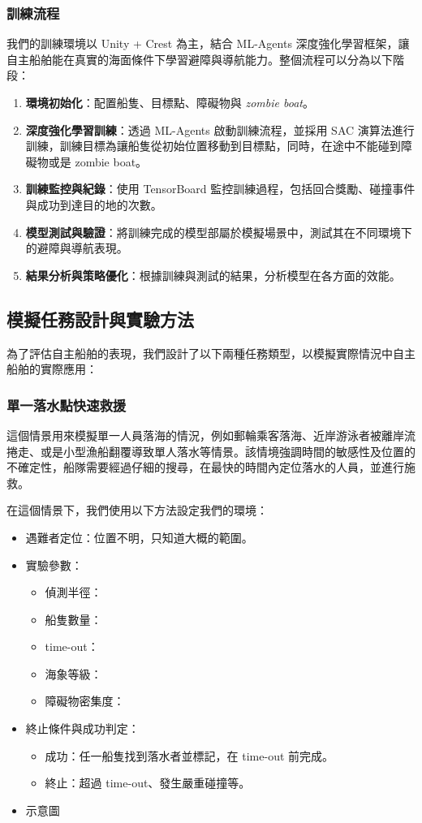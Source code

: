 \documentclass[12pt,a4paper]{article}
\begin{document}
\subsubsection{訓練流程}
我們的訓練環境以 Unity + Crest 為主，結合 ML-Agents 深度強化學習框架，讓自主船舶能在真實的海面條件下學習避障與導航能力。整個流程可以分為以下階段：
\begin{enumerate}
    \item \textbf{環境初始化}：配置船隻、目標點、障礙物與 \textit{zombie boat}。
    \item \textbf{深度強化學習訓練}：透過 ML-Agents 啟動訓練流程，並採用 SAC 演算法進行訓練，訓練目標為讓船隻從初始位置移動到目標點，同時，在途中不能碰到障礙物或是 zombie boat。
    \item \textbf{訓練監控與紀錄}：使用 TensorBoard 監控訓練過程，包括回合獎勵、碰撞事件與成功到達目的地的次數。
    \item \textbf{模型測試與驗證}：將訓練完成的模型部屬於模擬場景中，測試其在不同環境下的避障與導航表現。
    \item \textbf{結果分析與策略優化}：根據訓練與測試的結果，分析模型在各方面的效能。
\end{enumerate}

\subsection{模擬任務設計與實驗方法}
為了評估自主船舶的表現，我們設計了以下兩種任務類型，以模擬實際情況中自主船舶的實際應用：

\subsubsection{單一落水點快速救援}
這個情景用來模擬單一人員落海的情況，例如郵輪乘客落海、近岸游泳者被離岸流捲走、或是小型漁船翻覆導致單人落水等情景。該情境強調時間的敏感性及位置的不確定性，船隊需要經過仔細的搜尋，在最快的時間內定位落水的人員，並進行施救。
\\ \par
在這個情景下，我們使用以下方法設定我們的環境：
\begin{itemize}
    \item 遇難者定位：位置不明，只知道大概的範圍。
    \item 實驗參數：
    \begin{itemize}
        \item 偵測半徑：
        \item 船隻數量：
        \item time-out：
        \item 海象等級：
        \item 障礙物密集度：
    \end{itemize}
    \item 終止條件與成功判定：
    \begin{itemize}
        \item 成功：任一船隻找到落水者並標記，在 time-out 前完成。
        \item 終止：超過 time-out、發生嚴重碰撞等。
    \end{itemize}
    \item 示意圖
\end{itemize}
\end{document}
